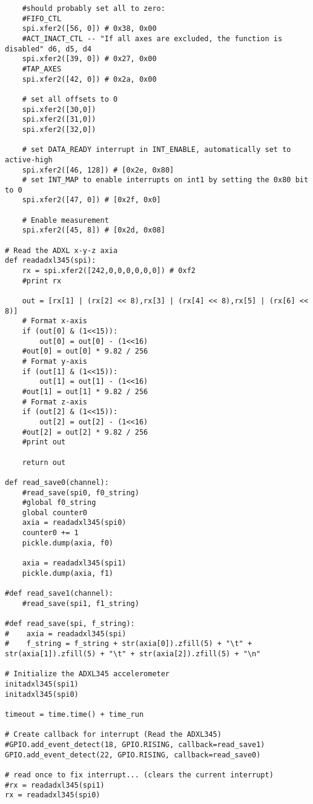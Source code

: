 \documentclass{sigchi}
\begin{document}
\begin{lstlisting}
    #should probably set all to zero:
    #FIFO_CTL
    spi.xfer2([56, 0]) # 0x38, 0x00
    #ACT_INACT_CTL -- "If all axes are excluded, the function is disabled" d6, d5, d4
    spi.xfer2([39, 0]) # 0x27, 0x00
    #TAP_AXES
    spi.xfer2([42, 0]) # 0x2a, 0x00

    # set all offsets to 0
    spi.xfer2([30,0])
    spi.xfer2([31,0])
    spi.xfer2([32,0])

    # set DATA_READY interrupt in INT_ENABLE, automatically set to active-high
    spi.xfer2([46, 128]) # [0x2e, 0x80]
    # set INT_MAP to enable interrupts on int1 by setting the 0x80 bit to 0
    spi.xfer2([47, 0]) # [0x2f, 0x0]

    # Enable measurement
    spi.xfer2([45, 8]) # [0x2d, 0x08]

# Read the ADXL x-y-z axia
def readadxl345(spi):
    rx = spi.xfer2([242,0,0,0,0,0,0]) # 0xf2
    #print rx

    out = [rx[1] | (rx[2] << 8),rx[3] | (rx[4] << 8),rx[5] | (rx[6] << 8)]
    # Format x-axis
    if (out[0] & (1<<15)):
        out[0] = out[0] - (1<<16)
    #out[0] = out[0] * 9.82 / 256
    # Format y-axis
    if (out[1] & (1<<15)):
        out[1] = out[1] - (1<<16)
    #out[1] = out[1] * 9.82 / 256
    # Format z-axis
    if (out[2] & (1<<15)):
        out[2] = out[2] - (1<<16)
    #out[2] = out[2] * 9.82 / 256
    #print out

    return out

def read_save0(channel):
    #read_save(spi0, f0_string)
    #global f0_string
    global counter0
    axia = readadxl345(spi0)
    counter0 += 1
    pickle.dump(axia, f0)

    axia = readadxl345(spi1)
    pickle.dump(axia, f1)

#def read_save1(channel):
    #read_save(spi1, f1_string)

#def read_save(spi, f_string):
#    axia = readadxl345(spi)
#    f_string = f_string + str(axia[0]).zfill(5) + "\t" + str(axia[1]).zfill(5) + "\t" + str(axia[2]).zfill(5) + "\n"

# Initialize the ADXL345 accelerometer
initadxl345(spi1)
initadxl345(spi0)

timeout = time.time() + time_run

# Create callback for interrupt (Read the ADXL345)
#GPIO.add_event_detect(18, GPIO.RISING, callback=read_save1)
GPIO.add_event_detect(22, GPIO.RISING, callback=read_save0) 

# read once to fix interrupt... (clears the current interrupt)
#rx = readadxl345(spi1)
rx = readadxl345(spi0)


\end{lstlisting}
\end{document}
